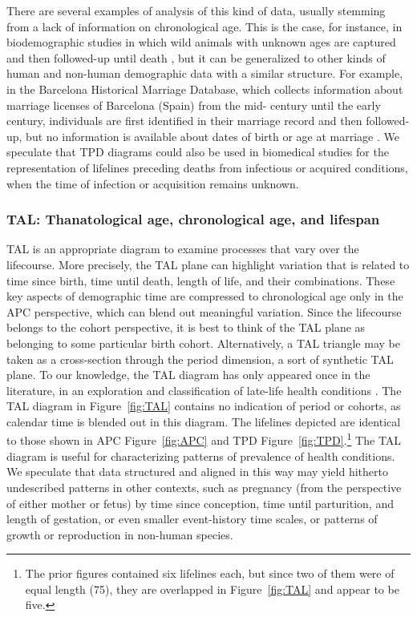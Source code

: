 \documentclass[12pt,oneside,a4paper]{article} %
\newcommand\tgh[1]{\raisebox{-.25\height}{\texttt{[image: Figures/triadtable/triad\#1.pdf]}}}
\begin{document}
There are several examples of analysis of this kind of
data, usually stemming from a lack of information on chronological age. This is
the case, for instance, in biodemographic studies in which wild animals with unknown
ages are captured and then followed-up until death
\citep{Muller2004,Muller2007}, but it can be generalized to other kinds of human
and non-human demographic data with a similar structure. For example, in the
Barcelona Historical Marriage Database, which collects information about
marriage licenses of Barcelona (Spain) from the mid- century until the
early  century, individuals are first identified in their marriage
record and then followed-up, but no information is available about dates of
birth or age at marriage \citep{villavicencio2015lifespans}.
We speculate that TPD diagrams could also be used in biomedical studies
for the representation of lifelines preceding deaths from infectious or acquired conditions, when the time of infection or acquisition remains unknown.


\FloatBarrier
\subsubsection{TAL: Thanatological age, chronological age, and
lifespan}%
\FloatBarrier  
TAL is an appropriate diagram to examine processes that vary over the
lifecourse.
More precisely, the TAL plane can highlight variation that is related to time
since birth, time until death, length of life, and their combinations. These
key aspects of demographic time are compressed to chronological age only in the
APC perspective, which can blend out meaningful variation. Since the lifecourse belongs to the cohort perspective, it is best to think of the TAL plane as belonging to some particular birth cohort. Alternatively, a TAL triangle may be taken as a cross-section through the period dimension, a sort of synthetic TAL plane. To our knowledge, the TAL diagram has only appeared once in the literature, in an exploration and classification of late-life health
conditions \citep{riffe2015ttd}. The TAL diagram in Figure~\ref{fig:TAL} contains
no indication of period or cohorts, as calendar time is blended out in this
diagram.
The lifelines depicted are identical to those shown in APC Figure~\ref{fig:APC} and TPD Figure~\ref{fig:TPD}.\footnote{The prior figures contained six lifelines each, but since two of them were of equal length (75), they are overlapped in
Figure~\ref{fig:TAL} and appear to be five.} The TAL diagram is useful for
characterizing patterns of prevalence of health conditions. We speculate
that data structured and aligned in this way may yield hitherto undescribed
patterns in other contexts, such as pregnancy (from the perspective of either
mother or fetus) by time since conception, time until parturition, and length of
gestation, or even smaller event-history time scales, or patterns of growth or reproduction in non-human species.
\end{document}
